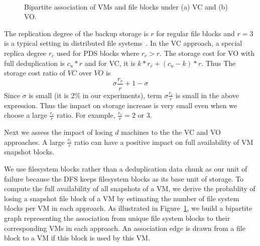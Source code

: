 \begin{figure}
    \centering
    \\
    \caption{Bipartite association of VMs and file blocks under (a) VC and (b) VO. }
    \label{fig:share}
\end{figure}

The replication degree of the backup storage 
is $r$ for regular file blocks and $r=3$ is a typical setting in distributed
file systems~\cite{googlefs03,hdfs10}.
In the VC approach, a special replica degree $r_c$ used for PDS blocks where $r_c>r$. 
The storage cost for VO with full deduplication is $c_u *r$ and for VC, it is
$ k*r_c  + (c_u-k)*r$. Thus The storage cost ratio of $VC$ over $VO$ is 
\[
\sigma \frac{r_c}{r} + 1-\sigma
\]
Since $\sigma$ is small (it is 2\% in our experiments),  
term $\sigma \frac{r_c}{r}$ is small in the above expression.  
Thus the impact on storage increase is very small even when we choose a large $\frac{r_c}{r}$ ratio. 
For example, $\frac{r_c}{r}=2$ or 3. 

Next we  assess  the impact of losing $d$ machines 
to the the VC and VO approaches.  
A large $\frac{r_c}{r}$ ratio can have a positive impact on full availability of VM snapshot blocks.

We use filesystem blocks rather than a deduplication
data chunk as our unit of failure because the DFS keeps
filesystem blocks as its base unit of storage.
To  compute the full availability of all snapshots of a VM, we derive
the probablity of losing a snapshot file block of a VM by
estimating the number of file system blocks per VM in each approach.
As illustrated in Figure~\ref{fig:share},
we build a bipartite graph representing the association from unique file system blocks
to their corresponding VMs in each approach. An association edge is  drawn  from a file block  to a VM 
if this block is used by this VM. 

